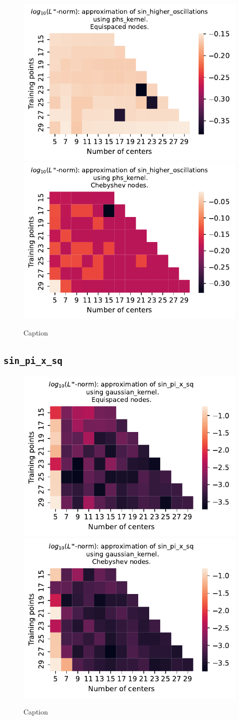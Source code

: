 \documentclass[12pt]{report} %
\begin{document}
\begin{figure}[ht]
    \centering
    
    \includegraphics[width=.49\textwidth]{imagenes/experiments/1d/variational/sin_higher_oscillations-Kphs_kernel-Equi.pdf}
    \includegraphics[width=.49\textwidth]{imagenes/experiments/1d/variational/sin_higher_oscillations-Kphs_kernel-Cheb.pdf}
    \caption{Caption}
    \label{fig:sin-higher-oscillations-phs}
\end{figure}

\subsection*{\texttt{sin\_pi\_x\_sq}}

\begin{figure}[ht]
    \centering
    
    \includegraphics[width=.49\textwidth]{imagenes/experiments/1d/variational/sin_pi_x_sq-Kgaussian_kernel-Equi.pdf}
    \includegraphics[width=.49\textwidth]{imagenes/experiments/1d/variational/sin_pi_x_sq-Kgaussian_kernel-Cheb.pdf}
    \caption{Caption}
    \label{fig:sin-pi-x-sq-gaussian}
\end{figure}
\end{document}
